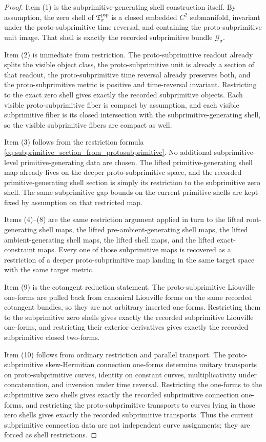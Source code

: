 \documentclass[11pt]{article}
\newcommand{\SubprimSpace}[1]{\mathcal G_{#1}}
\newcommand{\ProtoSubprimSection}[1]{\mathfrak T_{#1}^{\mathrm{psp}}}
\begin{document}
\begin{proof}
Item (1) is the subprimitive-generating shell construction itself. By assumption, the zero shell of \(\ProtoSubprimSection{\sigma}\) is a closed embedded \(C^2\) submanifold, invariant under the proto-subprimitive time reversal, and containing the proto-subprimitive unit image. That shell is exactly the recorded subprimitive bundle \(\SubprimSpace{\sigma}\).

Item (2) is immediate from restriction. The proto-subprimitive readout already splits the visible object class, the proto-subprimitive unit is already a section of that readout, the proto-subprimitive time reversal already preserves both, and the proto-subprimitive metric is positive and time-reversal invariant. Restricting to the exact zero shell gives exactly the recorded subprimitive objects. Each visible proto-subprimitive fiber is compact by assumption, and each visible subprimitive fiber is its closed intersection with the subprimitive-generating shell, so the visible subprimitive fibers are compact as well.

Item (3) follows from the restriction formula \eqref{eq:subprimitive_section_from_protosubprimitive}. No additional subprimitive-level primitive-generating data are chosen. The lifted primitive-generating shell map already lives on the deeper proto-subprimitive space, and the recorded primitive-generating shell section is simply its restriction to the subprimitive zero shell. The same subprimitive gap bounds on the current primitive shells are kept fixed by assumption on that restricted map.

Items (4)--(8) are the same restriction argument applied in turn to the lifted root-generating shell maps, the lifted pre-ambient-generating shell maps, the lifted ambient-generating shell maps, the lifted shell maps, and the lifted exact-constraint maps. Every one of those subprimitive maps is recovered as a restriction of a deeper proto-subprimitive map landing in the same target space with the same target metric.

Item (9) is the cotangent reduction statement. The proto-subprimitive Liouville one-forms are pulled back from canonical Liouville forms on the same recorded cotangent bundles, so they are not arbitrary inserted one-forms. Restricting them to the subprimitive zero shells gives exactly the recorded subprimitive Liouville one-forms, and restricting their exterior derivatives gives exactly the recorded subprimitive closed two-forms.

Item (10) follows from ordinary restriction and parallel transport. The proto-subprimitive skew-Hermitian connection one-forms determine unitary transports on proto-subprimitive curves, identity on constant curves, multiplicativity under concatenation, and inversion under time reversal. Restricting the one-forms to the subprimitive zero shells gives exactly the recorded subprimitive connection one-forms, and restricting the proto-subprimitive transports to curves lying in those zero shells gives exactly the recorded subprimitive transports. Thus the current subprimitive connection data are not independent curve assignments; they are forced as shell restrictions.


\end{proof}
\end{document}
